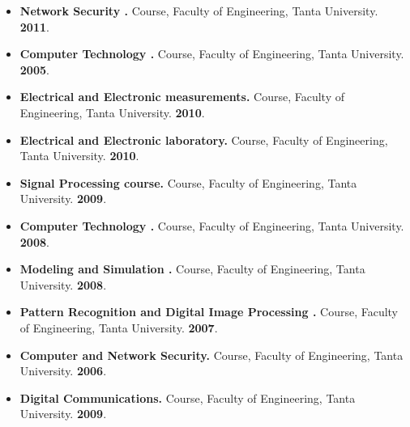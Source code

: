 \documentclass[10pt]{article}
\newenvironment{innerlist}[1][\enskip\textbullet]%
        {\begin{itemize}[#1,leftmargin=*,parsep=0pt,itemsep=0pt,topsep=0pt,partopsep=0pt]}
        {\end{itemize}}
\begin{document}
\begin{innerlist}
\item {\bf Network Security .} Course, Faculty of Engineering, Tanta University. \hfill {\bf 2011}.\\


\item {\bf Computer Technology .} Course, Faculty of Engineering, Tanta University. \hfill {\bf 2005}.\\

\item {\bf Electrical and Electronic measurements.} Course, Faculty of Engineering, Tanta University. \hfill {\bf 2010}.\\

\item {\bf Electrical and Electronic laboratory.} Course, Faculty of Engineering, Tanta University. \hfill {\bf 2010}.\\


\item {\bf Signal Processing course.} Course, Faculty of Engineering, Tanta University. \hfill {\bf 2009}.\\

\item {\bf Computer Technology .} Course, Faculty of Engineering, Tanta University. \hfill {\bf 2008}.\\


\item {\bf Modeling and Simulation .} Course, Faculty of Engineering, Tanta University. \hfill {\bf 2008}.\\

\item {\bf Pattern Recognition and Digital Image Processing .} Course, Faculty of Engineering, Tanta University. \hfill {\bf 2007}.\\

\item {\bf Computer and Network Security.} Course, Faculty of Engineering, Tanta University. \hfill {\bf 2006}.\\







\item {\bf Digital Communications.} Course, Faculty of Engineering, Tanta University. \hfill {\bf 2009}.\\


\end{innerlist}
\end{document}
